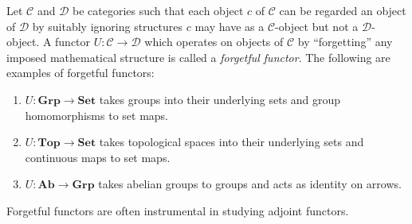 \documentclass[12pt]{article}
\begin{document}
Let $\mathcal{C}$ and $\mathcal{D}$ be categories such that each object $c$ of $\mathcal{C}$ can be regarded an object of $\mathcal{D}$ by suitably ignoring structures $c$ may have as a $\mathcal{C}$-object but not a $\mathcal{D}$-object. A functor $U:\mathcal{C} \to \mathcal{D}$ which operates on objects of $\mathcal{C}$ by ``forgetting'' any imposed mathematical structure is called a \emph{forgetful functor}. The following are examples of forgetful functors:
\begin{enumerate}
\item $U:\mathbf{Grp} \to \mathbf{Set}$ takes groups into their underlying sets and group homomorphisms to set maps.
\item $U:\mathbf{Top} \to \mathbf{Set}$ takes topological spaces into their underlying sets and continuous maps to set maps.
\item $U:\mathbf{Ab} \to \mathbf{Grp}$ takes abelian groups to groups and acts as identity on arrows.
\end{enumerate}
Forgetful functors are often instrumental in studying adjoint functors.
\end{document}
